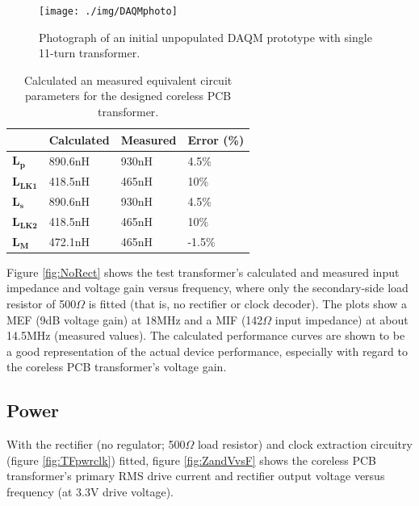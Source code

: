 \documentclass[conference]{IEEEtran}
\begin{document}
\begin{figure}[t]
	\centering
	\texttt{[image: ./img/DAQMphoto]}
	\caption{Photograph of an initial unpopulated DAQM prototype with single 11-turn transformer.}
	\label{fig:DAQMphoto}
\end{figure}

\begin{table}[t]
	\centering
	\caption{Calculated an measured equivalent circuit parameters for the designed coreless PCB transformer.}
	\label{tab:transformerParameters}
	\begin{tabular}{l|l|l|l|}
	\cline{2-4}
	              & \textbf{Calculated} & \textbf{Measured} & \textbf{Error (\%)} \\[3pt] \hline 
	\multicolumn{1}{|l|}{$\mathbf{L_{p}}$}   & 890.6nH    & 930nH    & 4.5\%      \\[3pt] \hline 
	\multicolumn{1}{|l|}{$\mathbf{L_{LK1}}$} & 418.5nH    & 465nH    & 10\%       \\[3pt] \hline 
	\multicolumn{1}{|l|}{$\mathbf{L_{s}}$}   & 890.6nH    & 930nH    & 4.5\%      \\[3pt] \hline 
	\multicolumn{1}{|l|}{$\mathbf{L_{LK2}}$} & 418.5nH    & 465nH    & 10\%       \\[3pt] \hline 
	\multicolumn{1}{|l|}{$\mathbf{L_{M}}$}   & 472.1nH    & 465nH    & -1.5\%     \\[3pt] \hline
	\end{tabular}
\end{table}

Figure \ref{fig:NoRect} shows the test transformer's calculated and measured input impedance and voltage gain versus frequency, where only the secondary-side load resistor of 500$\Omega$ is fitted (that is, no rectifier or clock decoder).  The plots show a MEF (9dB voltage gain) at 18MHz and a MIF (142$\Omega$ input impedance) at about 14.5MHz (measured values).  The calculated performance curves are shown to be a good representation of the actual device performance, especially with regard to the coreless PCB transformer's voltage gain.


	\subsection{Power}
	With the rectifier (no regulator; 500$\Omega$ load resistor) and clock extraction circuitry (figure \ref{fig:TFpwrclk}) fitted, figure \ref{fig:ZandVvsF} shows the coreless PCB transformer's primary RMS drive current and rectifier output voltage versus frequency (at 3.3V drive voltage).
	
\end{document}
